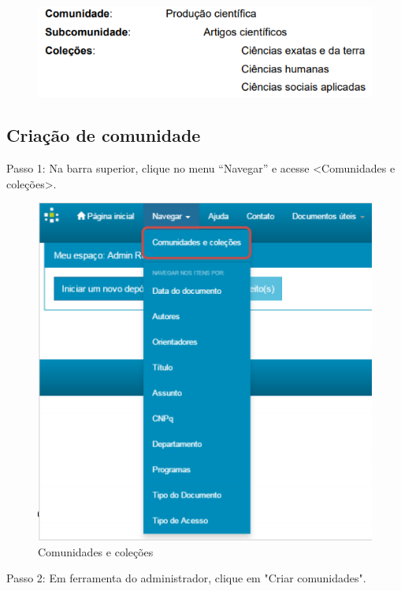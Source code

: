 \documentclass[12pt,hidelinks]{article}
\begin{document}
    \begin{figure}[!htp]
                \centering
                \includegraphics[scale=0.6]{figura/Comunidades.png}
            \label{Rotulo}
        \end{figure}
    
        \subsection{Criação de comunidade}
        
        Passo 1: Na barra superior, clique no menu “Navegar” e acesse <Comunidades e coleções>. 
        
        \begin{figure}[!htp]
                \centering
                \includegraphics[scale=0.8]{figura/Figura10.png}
                \caption{Comunidades e coleções}
            \label{Rotulo}
        \end{figure}
    
\newpage
     Passo 2: Em ferramenta do administrador, clique em "Criar comunidades". 
     
\end{document}
